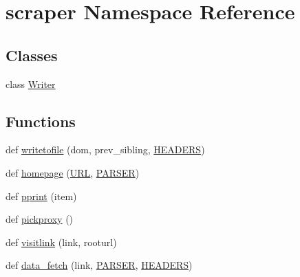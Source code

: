 \hypertarget{namespacescraper}{}\section{scraper Namespace Reference}
\label{namespacescraper}
\subsection*{Classes}
\begin{DoxyCompactItemize}
\item 
class \hyperlink{classscraper_1_1_writer}{Writer}
\end{DoxyCompactItemize}
\subsection*{Functions}
\begin{DoxyCompactItemize}
\item 
def \hyperlink{namespacescraper_a27f87ebb14485929bcd1982a27778d50}{writetofile} (dom, prev\+\_\+sibling, \hyperlink{namespacescraper_a2b868827f0fdbf8e5deff7fd8866ae2f}{H\+E\+A\+D\+E\+RS})
\item 
def \hyperlink{namespacescraper_aeb86f98f931e90255baf4fb49910864e}{homepage} (\hyperlink{namespacescraper_a60a59c7182708d1f2fdee75dd2a88e7d}{U\+RL}, \hyperlink{namespacescraper_a35fba8057dccafa1d2dc0c57018daaaa}{P\+A\+R\+S\+ER})
\item 
def \hyperlink{namespacescraper_a26b10fad0e94d8efd9f2898428bac030}{pprint} (item)
\item 
def \hyperlink{namespacescraper_a0a6f585850b06a4c6b484f8fd7abfa8b}{pickproxy} ()
\item 
def \hyperlink{namespacescraper_a2f3fce865692325e0b43867aa8f22fcb}{visitlink} (link, rooturl)
\item 
def \hyperlink{namespacescraper_ab4945d28c3c62df4daf0e3feedd2bd14}{data\+\_\+fetch} (link, \hyperlink{namespacescraper_a35fba8057dccafa1d2dc0c57018daaaa}{P\+A\+R\+S\+ER}, \hyperlink{namespacescraper_a2b868827f0fdbf8e5deff7fd8866ae2f}{H\+E\+A\+D\+E\+RS})
\end{DoxyCompactItemize}
